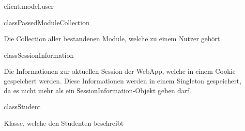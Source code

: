 \begin{texdocpackage}{client.model.user}
\label{texdoclet:edu.kit.informatik.studyplan.client.model.user}

\begin{texdocclass}{class}{PassedModuleCollection}
\label{texdoclet:edu.kit.informatik.studyplan.client.model.user.PassedModuleCollection}
\begin{texdocclassintro}
Die Collection aller bestandenen Module, welche zu einem Nutzer gehört\end{texdocclassintro}
\begin{texdocclassconstructors}
\end{texdocclassconstructors}
\begin{texdocclassmethods}
\end{texdocclassmethods}
\end{texdocclass}


\begin{texdocclass}{class}{SessionInformation}
\label{texdoclet:edu.kit.informatik.studyplan.client.model.user.SessionInformation}
\begin{texdocclassintro}
Die Informationen zur aktuellen Session der WebApp, welche in einem Cookie
 gespeichert werden. Diese Informationen werden in einem Singleton
 gespeichert, da es nicht mehr als ein SessionInformation-Objekt geben darf.\end{texdocclassintro}
\begin{texdocclassconstructors}
\end{texdocclassconstructors}
\begin{texdocclassmethods}
\end{texdocclassmethods}
\end{texdocclass}


\begin{texdocclass}{class}{Student}
\label{texdoclet:edu.kit.informatik.studyplan.client.model.user.Student}
\begin{texdocclassintro}
Klasse, welche den Studenten beschreibt\end{texdocclassintro}
\begin{texdocclassconstructors}
\end{texdocclassconstructors}
\end{texdocclass}


\end{texdocpackage}



